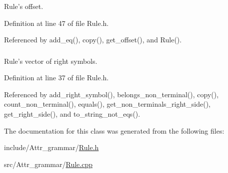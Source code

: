 Rule's offset. 



Definition at line 47 of file Rule.h.



Referenced by add\_\-eq(), copy(), get\_\-offset(), and Rule().

\hypertarget{classgenevalmag_1_1Rule_a54d3f67fb2b9adb926c9c82aa2d2353b}{
\subsubsection[{r\_\-right\_\-side}]{}}
\label{classgenevalmag_1_1Rule_a54d3f67fb2b9adb926c9c82aa2d2353b}


Rule's vector of right symbols. 



Definition at line 37 of file Rule.h.



Referenced by add\_\-right\_\-symbol(), belongs\_\-non\_\-terminal(), copy(), count\_\-non\_\-terminal(), equals(), get\_\-non\_\-terminals\_\-right\_\-side(), get\_\-right\_\-side(), and to\_\-string\_\-not\_\-eqs().



The documentation for this class was generated from the following files:\begin{DoxyCompactItemize}
\item 
include/Attr\_\-grammar/\hyperlink{Rule_8h}{Rule.h}\item 
src/Attr\_\-grammar/\hyperlink{Rule_8cpp}{Rule.cpp}\end{DoxyCompactItemize}
